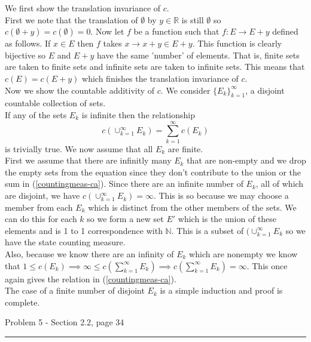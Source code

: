 \documentclass[11pt,reqno]{article}
\begin{document}
We first show the translation invariance of $c$. \\
First we note that the translation of $\emptyset$ by $y \in \mathbb{R}$ is still $\emptyset$ so $c(\emptyset + y) = c(\emptyset) = 0$. Now let $f$ be a function such that $f: E \to E + y$ defined as follows. If $x \in E$ then $f$ takes $x \to x + y \in E + y$. This function is clearly bijective so $E$ and $E + y$ have the same 'number' of elements. That is, finite sets are taken to finite sets and infinite sets are taken to infinite sets. This means that $c(E) = c(E + y)$ which finishes the translation invariance of $c$.\\
\indent Now we show the countable additivity of $c$.
We consider $\{ E_k \}^\infty_{k = 1}$, a disjoint countable collection of sets.\\
If any of the sets $E_k$ is infinite then the relationship 
\begin{equation}
c(\cup^\infty_{k = 1} E_k) = \sum^\infty_{k = 1} c(E_k) \label{countingmeas-ca}
\end{equation}
 is trivially true. We now assume that all $E_k$ are finite.\\
\indent First we assume that there are infinitly many $E_k$ that are non-empty and we drop the empty sets from the equation since they don't contribute to the union or the sum in (\ref{countingmeas-ca}).
Since there are an infinite number of $E_k$, all of which are disjoint, we have $c(\cup^\infty_{k = 1} E_k) = \infty$. This is so because we may choose a member from each $E_k$ which is distinct from the other members of the sets. We can do this for each $k$ so we form a new set $E'$ which is the union of these elements and is 1 to 1 correspondence with $\mathbb{N}$. This is a subset of $(\cup^\infty_{k = 1} E_k$ so we have the state counting measure.\\
\indent Also, because we know there are an infinity of $E_k$ which are nonempty we know that $1 \le c(E_k) \implies \infty \le c(\sum_{k = 1}^\infty E_k) \implies c(\sum_{k = 1}^\infty E_k) = \infty $. This once again gives the relation in (\ref{countingmeas-ca}).\\
The case of a finite number of disjoint $E_k$ is a simple induction and proof is complete.


\begin{flushleft} 
Problem 5 - Section 2.2, page 34\\
\rule{500pt}{1pt}\\
\end{flushleft} 
\end{document}
